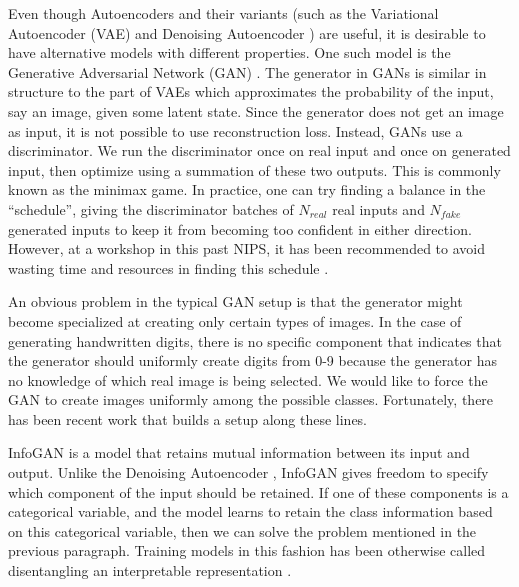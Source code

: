 \documentclass{article}
\begin{document}


Even though Autoencoders and their variants (such as the Variational Autoencoder (VAE) \cite{kingma_ae} and Denoising Autoencoder \cite{VincentBengioStackedAE}) are useful, it is desirable to have alternative models with different properties. One such model is the Generative Adversarial Network (GAN) \cite{goodfellow2014generative}. The generator in GANs is similar in structure to the part of VAEs which approximates the probability of the input, say an image, given some latent state. Since the generator does not get an image as input, it is not possible to use reconstruction loss. Instead, GANs use a discriminator. We run the discriminator once on real input and once on generated input, then optimize using a summation of these two outputs. This is commonly known as the minimax game. In practice, one can try finding a balance in the ``schedule'', giving the discriminator batches of $N_{real}$ real inputs and $N_{fake}$ generated inputs to keep it from becoming too confident in either direction. However, at a workshop in this past NIPS, it has been recommended to avoid wasting time and resources in finding this schedule \cite{howtotrainagan2016}.

An obvious problem in the typical GAN setup is that the generator might become specialized at creating only certain types of images. In the case of generating handwritten digits, there is no specific component that indicates that the generator should uniformly create digits from 0-9 because the generator has no knowledge of which real image is being selected. We would like to force the GAN to create images uniformly among the possible classes. Fortunately, there has been recent work that builds a setup along these lines.

InfoGAN is a model that retains mutual information between its input and output. Unlike the Denoising Autoencoder \cite{VincentBengioStackedAE}, InfoGAN gives freedom to specify which component of the input should be retained. If one of these components is a categorical variable, and the model learns to retain the class information based on this categorical variable, then we can solve the problem mentioned in the previous paragraph. Training models in this fashion has been otherwise called disentangling an interpretable representation \cite{kulkarni2015deep}.
\end{document}
